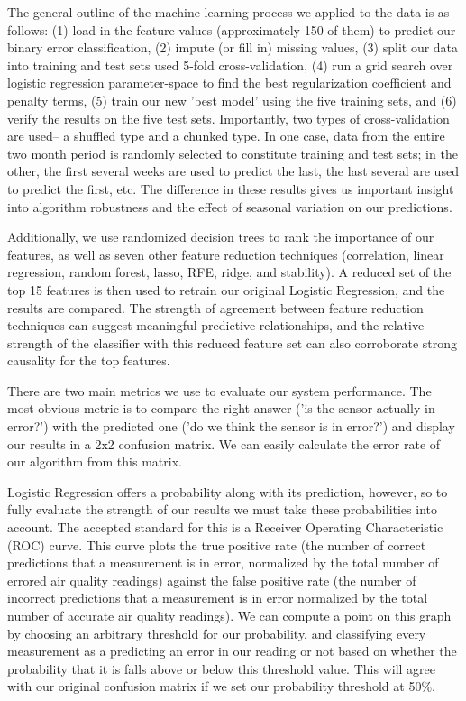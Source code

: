 The general outline of the machine learning process we applied to the data is as follows: (1) load in the feature values (approximately 150 of them) to predict our binary error classification, (2) impute (or fill in) missing values, (3) split our data into training and test sets used 5-fold cross-validation, (4) run a grid search over logistic regression parameter-space to find the best regularization coefficient and penalty terms, (5) train our new 'best model' using the five training sets, and (6) verify the results on the five test sets.  Importantly, two types of cross-validation are used-- a shuffled type and a chunked type.  In one case, data from the entire two month period is randomly selected to constitute training and test sets; in the other, the first several weeks are used to predict the last, the last several are used to predict the first, etc.  The difference in these results gives us important insight into algorithm robustness and the effect of seasonal variation on our predictions.  

Additionally, we use randomized decision trees to rank the importance of our features, as well as seven other feature reduction techniques (correlation, linear regression, random forest, lasso, RFE, ridge, and stability).  A reduced set of the top 15 features is then used to retrain our original Logistic Regression, and the results are compared.  The strength of agreement between feature reduction techniques can suggest meaningful predictive relationships, and the relative strength of the classifier with this reduced feature set can also corroborate strong causality for the top features.

There are two main metrics we use to evaluate our system performance.  The most obvious metric is to compare the right answer ('is the sensor actually in error?') with the predicted one ('do we think the sensor is in error?') and display our results in a 2x2 confusion matrix.  We can easily calculate the error rate of our algorithm from this matrix.

Logistic Regression offers a probability along with its prediction, however, so to fully evaluate the strength of our results we must take these probabilities into account.  The accepted standard for this is a Receiver Operating Characteristic (ROC) curve.  This curve plots the true positive rate (the number of correct predictions that a measurement is in error, normalized by the total number of errored air quality readings) against the false positive rate (the number of incorrect predictions that a measurement is in error normalized by the total number of accurate air quality readings).  We can compute a point on this graph by choosing an arbitrary threshold for our probability, and classifying every measurement as a predicting an error in our reading or not based on whether the probability that it is falls above or below this threshold value.  This will agree with our original confusion matrix if we set our probability threshold at 50\%.

